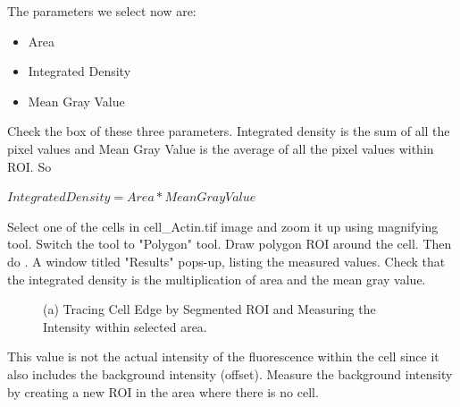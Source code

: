\begin{indentexercise}{1}
The parameters we select now are:
\begin{itemize}
\item Area
\item Integrated Density 
\item Mean Gray Value
\end{itemize}

Check the box of these three parameters. Integrated density is the sum
of all the pixel values and Mean Gray Value is the average of all the
pixel values within ROI. So 

$Integrated Density = Area * Mean Gray Value$

Select one of the cells in cell\_Actin.tif image and zoom it up
using magnifying tool. Switch the tool to
"Polygon" tool. Draw polygon ROI around
the cell. Then do . A window
titled "Results" pops-up, listing the
measured values. Check that the integrated density is the
multiplication of area and the mean gray value.




\begin{figure}[htbp]
 \centering
 \caption{ (a) Tracing Cell Edge by Segmented ROI and Measuring the Intensity within selected area. }
 \label{fig:CellIntensityMeasurement}
\end{figure} 

This value is not the actual intensity of the fluorescence within the
cell since it also includes the background intensity (offset).
Measure the background intensity by creating a new ROI in the area
where there is no cell.


\end{indentexercise}
